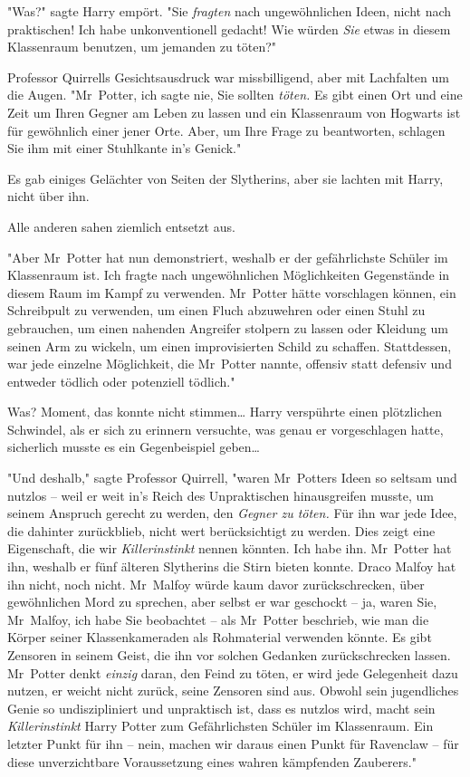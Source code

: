 {"Was?" sagte Harry empört. "Sie \emph{fragten} nach ungewöhnlichen Ideen, nicht nach praktischen! Ich habe unkonventionell gedacht! Wie würden \emph{Sie} etwas in diesem Klassenraum benutzen, um jemanden zu töten?"

Professor Quirrells Gesichtsausdruck war missbilligend, aber mit Lachfalten um die Augen. "Mr~Potter, ich sagte nie, Sie sollten \emph{töten.} Es gibt einen Ort und eine Zeit um Ihren Gegner am Leben zu lassen und ein Klassenraum von Hogwarts ist für gewöhnlich einer jener Orte. Aber, um Ihre Frage zu beantworten, schlagen Sie ihm mit einer Stuhlkante in's Genick."

Es gab einiges Gelächter von Seiten der Slytherins, aber sie lachten mit Harry, nicht über ihn.

Alle anderen sahen ziemlich entsetzt aus.

"Aber Mr~Potter hat nun demonstriert, weshalb er der gefährlichste Schüler im Klassenraum ist. Ich fragte nach ungewöhnlichen Möglichkeiten Gegenstände in diesem Raum im Kampf zu verwenden. Mr~Potter hätte vorschlagen können, ein Schreibpult zu verwenden, um einen Fluch abzuwehren oder einen Stuhl zu gebrauchen, um einen nahenden Angreifer stolpern zu lassen oder Kleidung um seinen Arm zu wickeln, um einen improvisierten Schild zu schaffen. Stattdessen, war jede einzelne Möglichkeit, die Mr~Potter nannte, offensiv statt defensiv und entweder tödlich oder potenziell tödlich."

Was? Moment, das konnte nicht stimmen… Harry verspührte einen plötzlichen Schwindel, als er sich zu erinnern versuchte, was genau er vorgeschlagen hatte, sicherlich musste es ein Gegenbeispiel geben…

"Und deshalb," sagte Professor Quirrell, "waren Mr~Potters Ideen so seltsam und nutzlos -- weil er weit in's Reich des Unpraktischen hinausgreifen musste, um seinem Anspruch gerecht zu werden, den \emph{Gegner zu töten.} Für ihn war jede Idee, die dahinter zurückblieb, nicht wert berücksichtigt zu werden. Dies zeigt eine Eigenschaft, die wir \emph{Killerinstinkt} nennen könnten. Ich habe ihn. Mr~Potter hat ihn, weshalb er fünf älteren Slytherins die Stirn bieten konnte. Draco Malfoy hat ihn nicht, noch nicht. Mr~Malfoy würde kaum davor zurückschrecken, über gewöhnlichen Mord zu sprechen, aber selbst er war geschockt -- ja, waren Sie, Mr~Malfoy, ich habe Sie beobachtet -- als Mr~Potter beschrieb, wie man die Körper seiner Klassenkameraden als Rohmaterial verwenden könnte. Es gibt Zensoren in seinem Geist, die ihn vor solchen Gedanken zurückschrecken lassen. Mr~Potter denkt \emph{einzig} daran, den Feind zu töten, er wird jede Gelegenheit dazu nutzen, er weicht nicht zurück, seine Zensoren sind aus. Obwohl sein jugendliches Genie so undiszipliniert und unpraktisch ist, dass es nutzlos wird, macht sein \emph{Killerinstinkt} Harry Potter zum Gefährlichsten Schüler im Klassenraum. Ein letzter Punkt für ihn -- nein, machen wir daraus einen Punkt für Ravenclaw -- für diese unverzichtbare Voraussetzung eines wahren kämpfenden Zauberers."

}
